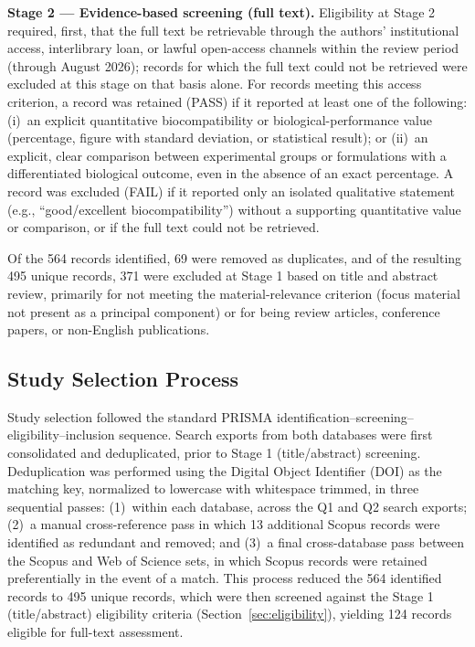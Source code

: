 \documentclass[5p,times,twocolumn]{elsarticle}
\begin{document}
\textbf{Stage 2 --- Evidence-based screening (full text).} Eligibility at Stage 2 required, first, that the full text be retrievable through the authors' institutional access, interlibrary loan, or lawful open-access channels within the review period (through August 2026); records for which the full text could not be retrieved were excluded at this stage on that basis alone. For records meeting this access criterion, a record was retained (PASS) if it reported at least one of the following: (i)~an explicit quantitative biocompatibility or biological-performance value (percentage, figure with standard deviation, or statistical result); or (ii)~an explicit, clear comparison between experimental groups or formulations with a differentiated biological outcome, even in the absence of an exact percentage. A record was excluded (FAIL) if it reported only an isolated qualitative statement (e.g., ``good/excellent biocompatibility'') without a supporting quantitative value or comparison, or if the full text could not be retrieved.

Of the 564 records identified, 69 were removed as duplicates, and of the resulting 495 unique records, 371 were excluded at Stage 1 based on title and abstract review, primarily for not meeting the material-relevance criterion (focus material not present as a principal component) or for being review articles, conference papers, or non-English publications.

\subsection{Study Selection Process}

Study selection followed the standard PRISMA identification--screening--eligibility--inclusion sequence. Search exports from both databases were first consolidated and deduplicated, prior to Stage 1 (title/abstract) screening. Deduplication was performed using the Digital Object Identifier (DOI) as the matching key, normalized to lowercase with whitespace trimmed, in three sequential passes: (1)~within each database, across the Q1 and Q2 search exports; (2)~a manual cross-reference pass in which 13 additional Scopus records were identified as redundant and removed; and (3)~a final cross-database pass between the Scopus and Web of Science sets, in which Scopus records were retained preferentially in the event of a match. This process reduced the 564 identified records to 495 unique records, which were then screened against the Stage 1 (title/abstract) eligibility criteria (Section~\ref{sec:eligibility}), yielding 124 records eligible for full-text assessment.
\end{document}
